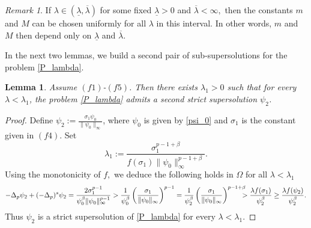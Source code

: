 \documentclass[reqno,oneside]{amsart}
\newtheorem{lemma}[theorem]{Lemma}
\theoremstyle{definition}
\theoremstyle{remark}
\newtheorem{remark}[theorem]{Remark}
\numberwithin{equation}{section}
\newcommand{\p}{\Delta_p}
\newcommand{\ps}{(-\Delta_p)^s}
\newcommand{\la} {\lambda}
\newcommand{\ba}{\beta}
\newcommand{\Om} {\Omega}
\newcommand{\si}{\sigma}
\begin{document}
\begin{remark}
    If $\la\in (\underline{\la}, \overline{\la})$ for some fixed $\underline{\la}>0$ and $\overline{\la}<\infty,$  then the constants $m$ and $M$ can be chosen uniformly for all $\lambda$ in this interval. In other words, $m$ and $M$ then depend only on $\underline{\la}$ and $\overline{\la}.$
\end{remark}

In the next two lemmas, we build a second pair of sub-supersolutions for the problem \eqref{P_lambda}.

\begin{lemma}\label{second_supersolution}
    Assume $(f1)$-$(f5)$. Then there exists $\la_1 >0$ such that for every $\la < \la_1$, the problem \eqref{P_lambda} admits a second strict supersolution $\psi_2$.
\end{lemma}

\begin{proof}
    Define $\psi_2:= \frac{\si_1 \psi_0}{\|\psi_0\|_{\infty}} $, where $\psi_0$ is given by \eqref{psi_0} and $\sigma_1$ is the constant given in $(f4)$. Set
    \begin{equation}\label{lambda_3}
        \la_1:= \frac{\si_1^{p-1+\ba}}{f(\si_1) \|\psi_0\|_{\infty}^{p-1+\ba}}.
    \end{equation}
    Using the monotonicity of $f,$ we deduce the following holds in $\Om$ for all $\la<\lambda_1$
    \begin{equation*}
        -\p \psi_2 + \ps \psi_2 = \frac{2 \si_1^{p-1}}{\psi_0^{\ba}\|\psi_0\|_{\infty}^{p-1}} > \frac{1}{\psi_0^{\ba}} \left( \frac{\si_1}{\|\psi_0\|_{\infty}} \right)^{p-1} = \frac{1}{\psi_2^{\ba}} \left( \frac{\si_1}{\|\psi_0\|_{\infty}} \right)^{p-1 +\ba} \hspace{-8pt} > \frac{\la f(\si_1)}{\psi_2^{\ba}} \geq \frac{\la f(\psi_2)}{\psi_2^{\ba}}.
    \end{equation*}
    Thus $\psi_2$ is a strict supersolution of \eqref{P_lambda} for every $\la < \la_1$.
\end{proof}
\end{document}
